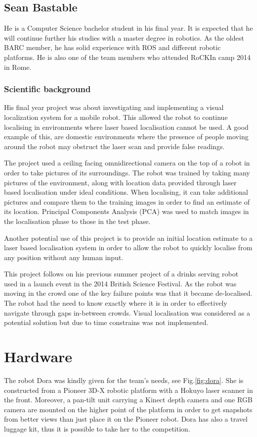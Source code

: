 \documentclass[conference]{IEEEtran}
\begin{document}
\subsection{Sean Bastable}

He is a Computer Science bachelor student in his final year. It is expected that he will continue further his studies with a master degree in robotics. As the oldest BARC member, he has solid experience with ROS and different robotic platforms. He is also one of the team members who attended RoCKIn camp 2014 in Rome.

\subsubsection*{Scientific background}
 
His final year project was about investigating and implementing a visual localization system for a mobile robot. This allowed the robot to continue localising in environments where laser based localisation cannot be used. A good example of this, are domestic environments where the presence of people moving around the robot may obstruct the laser scan and provide false readings.
 
The project used a ceiling facing omnidirectional camera on the top of a robot in order to take pictures of its surroundings.
The robot was trained by taking many pictures of the environment, along with location data provided through laser based localisation under ideal conditions. When localising, it can take additional pictures and compare them to the training images in order to find an estimate of its location. Principal Components Analysis (PCA) was used to match images in the localisation phase to those in the test phase. 

Another potential use of this project is to provide an initial location estimate to a laser based localisation system in order to allow the robot to quickly localise from any position without any human input.

This project follows on his previous summer project of a drinks serving robot used in a launch event in the 2014 British Science Festival. As the robot was moving in the crowd one of the key failure points was that it became de-localised. The robot had the need to know exactly where it is in order to effectively navigate through gaps in-between crowds. Visual localisation was considered as a potential solution but due to time constrains was not implemented.

\section{\label{sec:hardware}Hardware}
The robot Dora was kindly given for the team's needs, see Fig.\ref{fig:dora}. She is constructed from a Pioneer 3D-X robotic platform with a Hokuyo laser scanner in the front. Moreover, a pan-tilt unit carrying a Kinect depth camera and one RGB camera
are mounted on the higher point of the platform in order to get snapshots from better views than just place it on the Pioneer robot. Dora has also a travel luggage kit, thus it is possible to take her to the competition.
\end{document}

